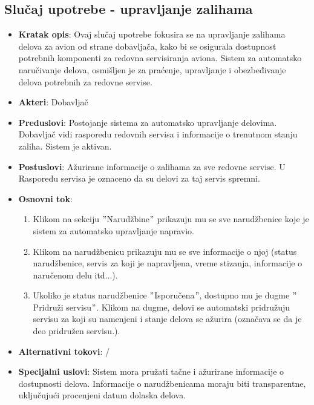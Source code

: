 \documentclass[a4paper]{article}
\begin{document}
\subsection{Slučaj upotrebe - upravljanje zalihama}
\label{subsec:redovan_servis}
\begin{itemize}
    \item \textbf{Kratak opis}: Ovaj slučaj upotrebe fokusira se na upravljanje zalihama delova za avion od strane dobavljača, kako bi se osigurala dostupnost potrebnih komponenti za redovna servisiranja aviona. Sistem za automatsko naručivanje delova, osmišljen je za praćenje, upravljanje i obezbeđivanje delova potrebnih za redovne servise.
    \item \textbf{Akteri}: Dobavljač
    \item \textbf{Preduslovi}: Postojanje sistema za automatsko upravljanje delovima. Dobavljač vidi rasporedu redovnih servisa i informacije o trenutnom stanju zaliha. Sistem je aktivan.
    \item \textbf{Postuslovi}: Ažurirane informacije o zalihama za sve redovne servise. U Rasporedu servisa je oznaceno da su delovi za taj servis spremni.
    \item \textbf{Osnovni tok}:
        \begin{enumerate}
            \item Klikom na sekciju $"$Narudžbine$"$ prikazuju mu se sve narudžbenice koje je sistem za automatsko upravljanje napravio.
            \item Klikom na narudžbenicu prikazuju mu se sve informacije o njoj (status narudžbenice, servis za koji je napravljena, vreme stizanja, informacije o naručenom delu itd...).
            \item Ukoliko je status narudžbenice $"$Isporučena$"$, dostupno mu je dugme $"$Pridruži servisu$"$. Klikom na dugme, delovi se automatski pridružuju servisu za koji su namenjeni i stanje delova se ažurira (označava se da je deo pridružen servisu.).
        \end{enumerate}
    \item \textbf{Alternativni tokovi}: /
    \item \textbf{Specijalni uslovi}: Sistem mora pružati tačne i ažurirane informacije o dostupnosti delova. Informacije o narudžbenicama moraju biti transparentne, uključujući procenjeni datum dolaska delova.
\end{itemize}
\end{document}
